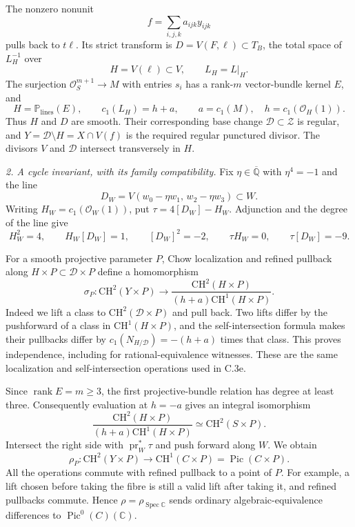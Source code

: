 The nonzero nonunit
\[
                      f=\sum_{i,j,k}a_{ijk}y_{ijk}
\]
pulls back to $t\ell$. Its strict transform is
$D=V(F,\ell)\subset T_B$, the total space of $L_H^{-1}$
over
\[
 H=V(\ell)\subset V,
 \qquad L_H=L|_H.
\]
The surjection $\mathcal O_S^{m+1}\to M$ with entries
$s_i$ has a rank-$m$ vector-bundle kernel $E$, and
\[
             H=\mathbb P_{\mathrm{lines}}(E),
             \qquad c_1(L_H)=h+a,
             \qquad a=c_1(M),\quad h=c_1(\mathcal O_H(1)).
\]
Thus $H$ and $D$ are smooth. Their corresponding base
change $\mathcal D\subset\mathcal Z$ is regular, and
$Y=\mathcal D\setminus H=X\cap V(f)$ is the required
regular punctured divisor. The divisors $V$ and
$\mathcal D$ intersect transversely in $H$.

\emph{2. A cycle invariant, with its family compatibility.}
Fix $\eta\in\overline{\mathbb Q}$ with $\eta^4=-1$ and
the line
\[
 D_W=V(w_0-\eta w_1,\,w_2-\eta w_3)\subset W.
\]
Writing $H_W=c_1(\mathcal O_W(1))$, put
$\tau=4[D_W]-H_W$. Adjunction and the degree of the line
give
\begin{equation}\label{eq:C3ae-intersections}
 H_W^2=4,\qquad H_W[D_W]=1,\qquad [D_W]^2=-2,
 \qquad \tau H_W=0,\qquad \tau[D_W]=-9.
\end{equation}

For a smooth projective parameter $P$, Chow localization
and refined pullback along $H\times P\subset\mathcal D\times P$
define a homomorphism
\[
 \sigma_P:\mathrm{CH}^2(Y\times P)
 \longrightarrow
 \frac{\mathrm{CH}^2(H\times P)}
 {(h+a)\mathrm{CH}^1(H\times P)}.
\]
Indeed we lift a class to $\mathrm{CH}^2(\mathcal D\times P)$
and pull back. Two lifts differ by the pushforward of a
class in $\mathrm{CH}^1(H\times P)$, and the
self-intersection formula makes their pullbacks differ
by $c_1(N_{H/\mathcal D})=-(h+a)$ times that class.
This proves independence, including for rational-equivalence
witnesses. These are the same localization and
self-intersection operations used in C.3e.

Since $\operatorname{rank}E=m\ge3$, the first
projective-bundle relation has degree at least three.
Consequently evaluation at $h=-a$ gives an integral
isomorphism
\begin{equation}\label{eq:C3ae-evaluation}
 \frac{\mathrm{CH}^2(H\times P)}
 {(h+a)\mathrm{CH}^1(H\times P)}
                   \simeq \mathrm{CH}^2(S\times P).
\end{equation}
Intersect the right side with $\operatorname{pr}_W^*\tau$
and push forward along $W$. We obtain
\begin{equation}\label{eq:C3ae-rho}
 \rho_P:\mathrm{CH}^2(Y\times P)
       \longrightarrow \mathrm{CH}^1(C\times P)
       =\operatorname{Pic}(C\times P).
\end{equation}
All the operations commute with refined pullback to a
point of $P$. For example, a lift chosen before taking
the fibre is still a valid lift after taking it, and
refined pullbacks commute. Hence $\rho=\rho_{\operatorname{Spec}\mathbb C}$
sends ordinary algebraic-equivalence differences to
$\operatorname{Pic}^0(C)(\mathbb C)$.

